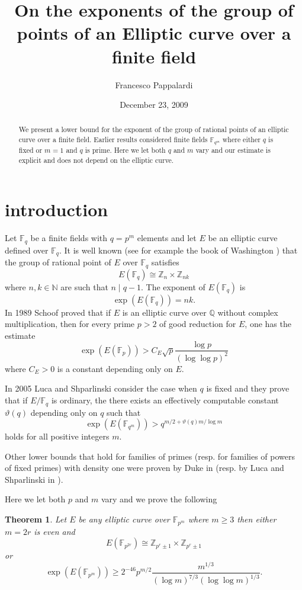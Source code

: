 \documentclass{amsart}
\title[On the exponent of elliptic curves]{On the exponents of the group of points of an Elliptic curve over a finite field}
\author{Francesco Pappalardi}
\date{December 23, 2009}
\def\Z{{\mathbb Z}}
\def\F{{\mathbb F}}
\newtheorem*{theorem}{Theorem}
\begin{document}
\begin{abstract} We present a lower bound for the exponent of the group
of rational points of an elliptic curve over a finite field. Earlier results 
considered finite fields $\F_{q^m}$ where either $q$ is fixed or $m=1$ and
$q$ is prime. Here we let both $q$ and $m$ vary and our estimate is explicit
and does not depend on the elliptic curve.\end{abstract}
\maketitle
\section{introduction}
Let $\F_q$ be a finite fields with $q=p^m$ elements and let $E$ be an elliptic 
curve defined over $\F_q$. It is well known (see for example the book of Washington \cite{washington})
that the group of rational point of $E$ over $\F_q$ satisfies
$$E(\F_q)\cong \Z_n\times\Z_{nk}$$
where $n,k\in\mathbb N$ are such that $n\mid q-1$. The exponent of $E(\F_q)$ is
$$\exp(E(\F_q))=nk.$$
In 1989 Schoof \cite{schoof} proved that if $E$ is an elliptic curve over $\mathbb Q$ without complex multiplication, then
for every prime $p>2$ of good reduction for $E$, one has the estimate 
$$\exp(E(\F_p))> C_E \sqrt{p}\frac{\log p}{(\log\log p)^2}$$
where $C_E>0$ is a constant depending only on $E$.

In 2005 Luca and Shparlinski \cite{lucashparlinski} consider the case when $q$ is fixed and they prove that if $E/\F_q$
is ordinary, the there exists an effectively computable constant $\vartheta(q)$ depending only on $q$
such that
\begin{equation}\label{eq:florianigor}
\exp(E(\F_{q^m}))> q^{m/2+\vartheta(q)m/\log m}
\end{equation}
holds for all positive integers $m$.

Other lower bounds that hold for families of primes (resp. for families of powers of fixed primes) with density one were
proven by Duke in \cite{duke} (resp. by Luca and Shparlinski in \cite{lucashparlinski}).

Here we let both $p$ and $m$ vary and we prove the following
\begin{theorem} Let $E$ be any elliptic curve over $\F_{p^m}$ where $m\ge3$ then either $m=2r$ is even and 
$$E(\F_{p^{2r}})\cong \Z_{p^r\pm1}\times\Z_{p^r\pm1}$$
or
$$\exp(E(\F_{p^m}))\ge 2^{-46}p^{m/2}\frac{m^{1/3}}{(\log m)^{7/3}(\log\log m)^{1/3}}.$$
\end{theorem}
\end{document}
